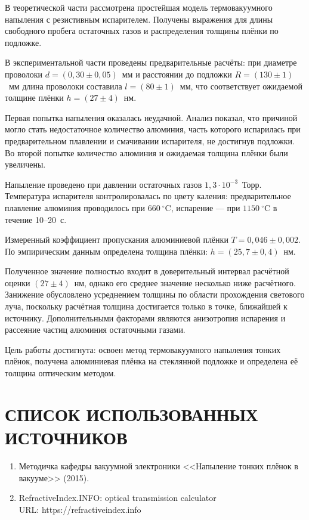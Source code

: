 \documentclass[a4paper, 14pt]{extarticle}
\begin{document}
	В теоретической части рассмотрена простейшая модель термовакуумного
	напыления с резистивным испарителем. Получены выражения для длины
	свободного пробега остаточных газов и распределения толщины плёнки по подложке. 
	
	В экспериментальной части проведены предварительные расчёты: при диаметре проволоки
	$d = (0{,}30 \pm 0{,}05)$~мм и расстоянии до подложки
	$R = (130 \pm 1)$~мм длина проволоки составила $l = (80 \pm 1)$~мм,
	что соответствует ожидаемой толщине плёнки $h = (27 \pm 4)$~нм.
	
	Первая попытка напыления оказалась неудачной. Анализ
	показал, что причиной могло стать недостаточное количество алюминия,
	часть которого испарилась при предварительном плавлении и
	смачивании испарителя, не достигнув подложки. Во второй попытке
	количество алюминия и ожидаемая толщина плёнки были увеличены.
	
	Напыление проведено при давлении остаточных газов
	$1{,}3 \cdot 10^{-3}$~Торр. Температура испарителя контролировалась
	по цвету каления: предварительное плавление алюминия проводилось при
	$660~^\circ$C, испарение --- при $1150~^\circ$C в течение 10--20~с.
	
	Измеренный коэффициент пропускания алюминиевой плёнки $T = 0{,}046 \pm 0{,}002$. По эмпирическим
	данным определена толщина плёнки:
	$h = (25{,}7 \pm 0{,}4)$~нм.
	
	Полученное значение полностью входит в доверительный интервал
	расчётной оценки $(27 \pm 4)$~нм, однако его среднее значение
	несколько ниже расчётного. Занижение обусловлено усреднением толщины
	по области прохождения светового луча, поскольку расчётная толщина
	достигается только в точке, ближайшей к источнику. Дополнительными
	факторами являются анизотропия испарения и рассеяние частиц алюминия
	остаточными газами.
	
	Цель работы достигнута: освоен метод термовакуумного
	напыления тонких плёнок, получена алюминиевая плёнка на стеклянной
	подложке и определена её толщина оптическим методом. 
	
	\section*{СПИСОК ИСПОЛЬЗОВАННЫХ ИСТОЧНИКОВ}
	
	\begin{enumerate}
		\item Методичка кафедры вакуумной электроники <<Напыление тонких плёнок в вакууме>> (2015).
		\item RefractiveIndex.INFO: optical transmission calculator \\ URL: https://refractiveindex.info

	\end{enumerate}
	
	
\end{document}
